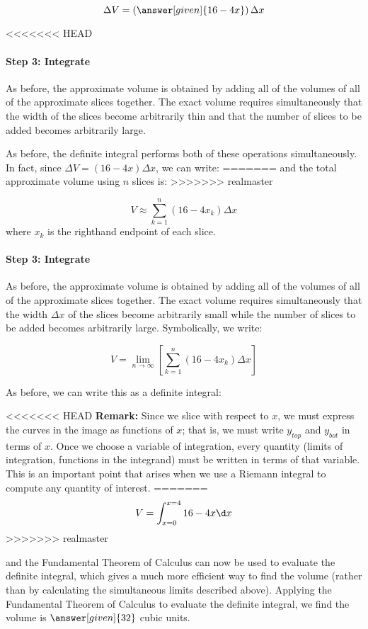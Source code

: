 \documentclass{ximera}
\begin{document}
\[
\Delta V = \left(\answer[given]{16-4x}\right) \Delta x
\]

<<<<<<< HEAD
\paragraph{Step 3: Integrate}
As before, the approximate volume is obtained by adding all of the volumes of all of the approximate slices together.  The exact volume requires simultaneously that the width of the slices become arbitrarily thin and that the number of slices to be added becomes arbitrarily large.

As before, the definite integral performs both of these operations simultaneously.  In fact, since $\Delta V = (16-4x) \Delta x$, we can write:
=======
and the total approximate volume using $n$ slices is:
>>>>>>> realmaster

\[
V \approx  \sum_{k=1}^n (16-4x_k) \Delta x
\]
where $x_k$ is the righthand endpoint of each slice.

\paragraph{Step 3: Integrate}
As before, the approximate volume is obtained by adding all of the volumes of all of the approximate slices together.  The exact volume requires simultaneously that the width $\Delta x$ of the slices become arbitrarily small while the number of slices to be added becomes arbitrarily large.  Symbolically, we write:

\[
V = \lim_{n \to \infty} \left[\sum_{k=1}^n (16-4x_k) \Delta x\right]
\]

As before, we can write this as a definite integral:

<<<<<<< HEAD
\textbf{Remark:} Since we slice with respect to $x$, we must express the curves in the image as functions of $x$; that is, we must write $y_{top}$ and $y_{bot}$ in terms of $x$.  Once we choose a variable of integration, every quantity (limits of integration, functions in the integrand) must be written in terms of that variable.  This is an important point that arises when we use a Riemann integral to compute any quantity of interest.
=======
\[
V = \int_{x=0}^{x=4} 16-4x \d x
\]
>>>>>>> realmaster

and the Fundamental Theorem of Calculus can now be used to evaluate the definite integral, which gives a much more efficient way to find the volume (rather than by calculating the simultaneous limits described above).  Applying the Fundamental Theorem of Calculus to evaluate the definite integral, we find the volume is $\answer[given]{32}$ cubic units.
\end{document}
